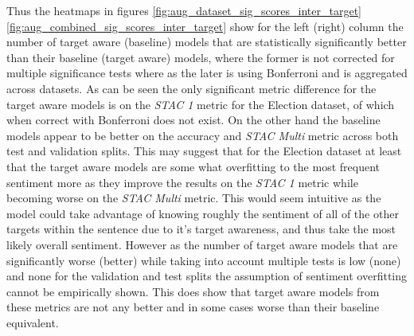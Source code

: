 Thus the heatmaps in figures \ref{fig:aug_dataset_sig_scores_inter_target} \ref{fig:aug_combined_sig_scores_inter_target} show for the left (right) column the number of target aware (baseline) models that are statistically significantly better than their baseline (target aware) models, where the former is not corrected for multiple significance tests where as the later is using
Bonferroni and is aggregated across datasets. As can be seen the only significant metric difference for the target aware models is on the \textit{STAC 1} metric for the Election dataset, of which when correct with Bonferroni does not exist. On the other hand the baseline models appear to be better on the accuracy and \textit{STAC Multi} metric across both test and validation splits. This may suggest that for the Election dataset at least that the target aware models are some what overfitting to the most frequent sentiment more as they improve the results on the \textit{STAC 1} metric while becoming worse on the \textit{STAC Multi} metric. This would seem intuitive as the model could take advantage of knowing roughly the sentiment of all of the other targets within the sentence due to it's target awareness, and thus take the most likely overall sentiment. However as the number of target aware models that are significantly worse (better) while taking into account multiple tests is low (none) and none for the validation and test splits the assumption of sentiment overfitting cannot be empirically shown. This does show that target aware models from these metrics are not any better and in some cases worse than their baseline equivalent.

